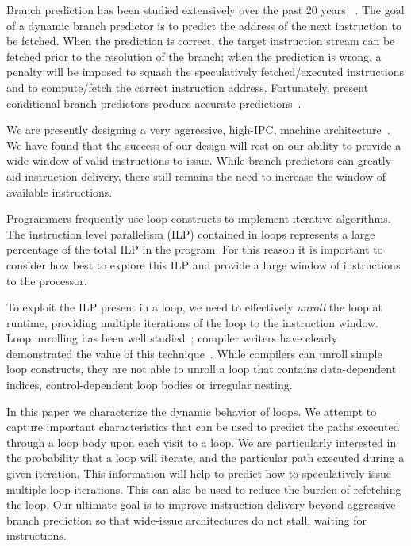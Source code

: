 \documentclass[times,10pt,twocolumn]{article}
\begin{document}
Branch prediction has been studied extensively over the past 20 years 
~\cite{glo96,kae97,lee84,pan92,Smi81,Yeh93}. 
The goal of a dynamic branch predictor is to predict the address of the next 
instruction to be fetched. When the prediction is correct, the target instruction
stream can be fetched prior to the resolution of the branch;  when the prediction 
is wrong, a penalty will be imposed to squash the speculatively fetched/executed
instructions and to compute/fetch 
the correct instruction address. Fortunately, present conditional branch
predictors produce accurate predictions~\cite{Yeh93}.

We are presently designing a very aggressive, high-IPC, machine architecture~\cite{LevoTech01}.
We have found that the success of our design will rest on 
our ability to provide a wide window of valid instructions to issue. 
While branch predictors can greatly aid instruction delivery, there still
remains the need to increase the window of available instructions.

Programmers frequently use loop constructs to implement iterative algorithms. The 
instruction level parallelism (ILP) contained in loops represents a 
large percentage of the total ILP in the program. For this reason it is important to 
consider how best to explore this ILP and provide a large window of instructions
to the processor.  

To exploit the ILP present in a loop, we need to effectively {\em unroll}
the loop at runtime, providing multiple iterations of the loop to the instruction
window.  Loop unrolling has been well studied~\cite{Dav95,Mah92,Sai98};
compiler writers have clearly 
demonstrated the value of this technique~\cite{Lam88,Mck96}.  
While compilers can unroll simple loop constructs, they are not able to 
unroll a loop that contains data-dependent indices, control-dependent loop
bodies or irregular nesting.

In this paper we characterize the dynamic behavior of loops.
We attempt to capture important characteristics that can be used to 
predict the paths executed through a loop body upon each
visit to a loop.  We are particularly interested in 
the probability that a loop will iterate, and the
particular path executed during a given iteration. 
This information will help to predict how to speculatively issue multiple
loop iterations. 
This can also be used to  reduce the burden of refetching the loop.
Our ultimate goal is to improve instruction delivery beyond aggressive
branch prediction so that wide-issue architectures do not stall, waiting
for instructions.
\end{document}

